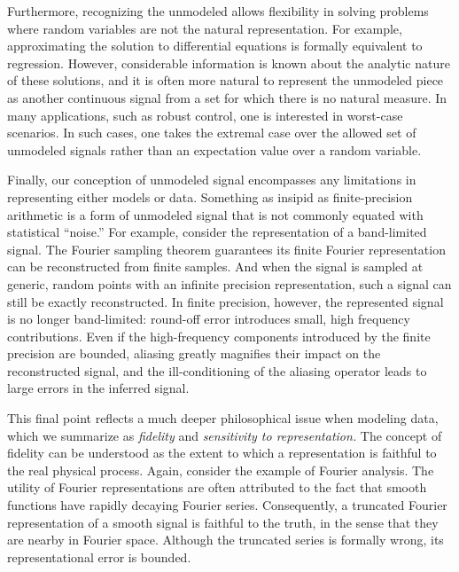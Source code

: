 \documentclass[twocolumn,aps,prx,superscriptaddress,10pt]{revtex4-2}
\newcommand{\0}{\bm{0}}
\begin{document}
Furthermore, recognizing the unmodeled allows flexibility in solving problems where random variables are not the natural representation.
For example, approximating the solution to differential equations is formally equivalent to regression.
However, considerable information is known about the analytic nature of these solutions, and it is often more natural to represent the unmodeled piece as another continuous signal from a set for which there is no natural measure.
In many applications, such as robust control, one is interested in worst-case scenarios.
In such cases, one takes the extremal case over the allowed set of unmodeled signals rather than an expectation value over a random variable.

Finally, our conception of unmodeled signal encompasses any limitations in representing either models or data.
Something as insipid as finite-precision arithmetic is a form of unmodeled signal that is not commonly equated with statistical ``noise.''
For example, consider the representation of a band-limited signal.
The Fourier sampling theorem guarantees its finite Fourier representation can be reconstructed from finite samples.
And when the signal is sampled at generic, random points
with an infinite precision representation, such a signal can still be exactly reconstructed.
In finite precision, however, the represented signal is no longer band-limited: round-off error introduces small, high frequency contributions.
Even if the high-frequency components introduced by the finite precision are bounded, aliasing greatly magnifies their impact on the reconstructed signal, and  the ill-conditioning of the aliasing operator leads to large errors in the inferred signal.

This final point reflects a much deeper philosophical issue when modeling data, which we summarize as \emph{fidelity} and \emph{sensitivity to representation.}
The concept of fidelity can be understood as the extent to which a representation is faithful to the real physical process.
Again, consider the example of Fourier analysis.
The utility of Fourier representations are often attributed to the fact that smooth functions have rapidly decaying Fourier series.
Consequently, a truncated Fourier representation of a smooth signal is faithful to the truth, in the sense that they are nearby in Fourier space.
Although the truncated series is formally wrong, its representational error is bounded.
\end{document}
